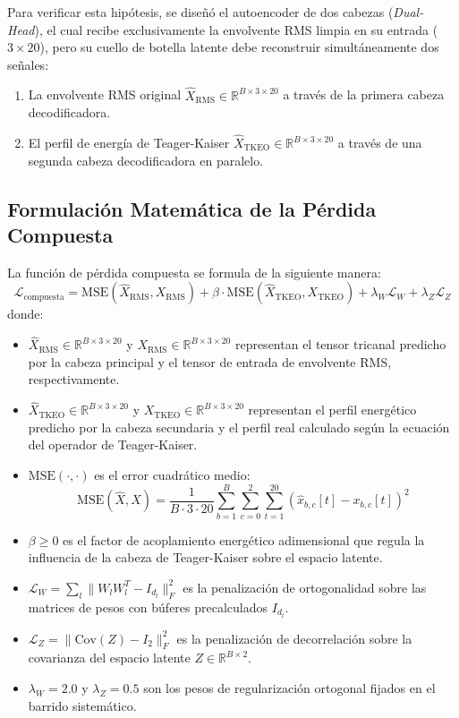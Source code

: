 \documentclass[11pt,a4paper,openany]{book}
\theoremstyle{definition}
\begin{document}
Para verificar esta hipótesis, se diseñó el autoencoder de dos cabezas (\textit{Dual-Head}), el cual recibe exclusivamente la envolvente RMS limpia en su entrada ($3 \times 20$), pero su cuello de botella latente debe reconstruir simultáneamente dos señales:
\begin{enumerate}
    \item La envolvente RMS original $\hat{X}_{\text{RMS}} \in \mathbb{R}^{B \times 3 \times 20}$ a través de la primera cabeza decodificadora.
    \item El perfil de energía de Teager-Kaiser $\hat{X}_{\text{TKEO}} \in \mathbb{R}^{B \times 3 \times 20}$ a través de una segunda cabeza decodificadora en paralelo.
\end{enumerate}

\subsection{Formulación Matemática de la Pérdida Compuesta}
\label{subsec:form_perdida_compuesta}

La función de pérdida compuesta se formula de la siguiente manera:
\begin{equation}
    \mathcal{L}_{\text{compuesta}} = \text{MSE}(\hat{X}_{\text{RMS}}, X_{\text{RMS}}) + \beta \cdot \text{MSE}(\hat{X}_{\text{TKEO}}, X_{\text{TKEO}}) + \lambda_W \mathcal{L}_W + \lambda_Z \mathcal{L}_Z
\end{equation}
donde:
\begin{itemize}
    \item $\hat{X}_{\text{RMS}} \in \mathbb{R}^{B \times 3 \times 20}$ y $X_{\text{RMS}} \in \mathbb{R}^{B \times 3 \times 20}$ representan el tensor tricanal predicho por la cabeza principal y el tensor de entrada de envolvente RMS, respectivamente.
    \item $\hat{X}_{\text{TKEO}} \in \mathbb{R}^{B \times 3 \times 20}$ y $X_{\text{TKEO}} \in \mathbb{R}^{B \times 3 \times 20}$ representan el perfil energético predicho por la cabeza secundaria y el perfil real calculado según la ecuación del operador de Teager-Kaiser.
    \item $\text{MSE}(\cdot, \cdot)$ es el error cuadrático medio:
    \begin{equation}
        \text{MSE}(\hat{X}, X) = \frac{1}{B \cdot 3 \cdot 20} \sum_{b=1}^B \sum_{c=0}^2 \sum_{t=1}^{20} (\hat{x}_{b, c}[t] - x_{b, c}[t])^2
    \end{equation}
    \item $\beta \ge 0$ es el factor de acoplamiento energético adimensional que regula la influencia de la cabeza de Teager-Kaiser sobre el espacio latente.
    \item $\mathcal{L}_W = \sum_{l} \|W_l W_l^T - I_{d_l}\|_F^2$ es la penalización de ortogonalidad sobre las matrices de pesos con búferes precalculados $I_{d_l}$.
    \item $\mathcal{L}_Z = \|\text{Cov}(Z) - I_2\|_F^2$ es la penalización de decorrelación sobre la covarianza del espacio latente $Z \in \mathbb{R}^{B \times 2}$.
    \item $\lambda_W = 2.0$ y $\lambda_Z = 0.5$ son los pesos de regularización ortogonal fijados en el barrido sistemático.
\end{itemize}
\end{document}
